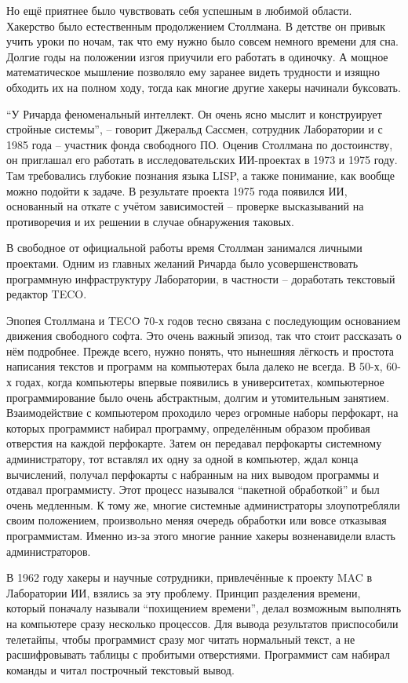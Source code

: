 Но ещё приятнее было чувствовать себя успешным в любимой области. Хакерство было естественным продолжением Столлмана. В детстве он привык учить уроки по ночам, так что ему нужно было совсем немного времени для сна. Долгие годы на положении изгоя приучили его работать в одиночку. А мощное математическое мышление позволяло ему заранее видеть трудности и изящно обходить их на полном ходу, тогда как многие другие хакеры начинали буксовать.

\enquote{У Ричарда феноменальный интеллект. Он очень ясно мыслит и конструирует стройные системы}, -- говорит Джеральд Сассмен, сотрудник Лаборатории и с 1985 года -- участник фонда свободного ПО. Оценив Столлмана по достоинству, он приглашал его работать в исследовательских ИИ-проектах в 1973 и 1975 году. Там требовались глубокие познания языка LISP, а также понимание, как вообще можно подойти к задаче. В результате проекта 1975 года появился ИИ, основанный на откате с учётом зависимостей -- проверке высказываний на противоречия и их решении в случае обнаружения таковых.

В свободное от официальной работы время Столлман занимался личными проектами. Одним из главных желаний Ричарда было усовершенствовать программную инфраструктуру Лаборатории, в частности -- доработать текстовый редактор TECO.

Эпопея Столлмана и TECO 70-х годов тесно связана с последующим основанием движения свободного софта. Это очень важный эпизод, так что стоит рассказать о нём подробнее. Прежде всего, нужно понять, что нынешняя лёгкость и простота написания текстов и программ на компьютерах была далеко не всегда. В 50-х, 60-х годах, когда компьютеры впервые появились в университетах, компьютерное программирование было очень абстрактным, долгим и утомительным занятием. Взаимодействие с компьютером проходило через огромные наборы перфокарт, на которых программист набирал программу, определённым образом пробивая отверстия на каждой перфокарте. Затем он передавал перфокарты системному администратору, тот вставлял их одну за одной в компьютер, ждал конца вычислений, получал перфокарты с набранным на них выводом программы и отдавал программисту. Этот процесс назывался \enquote{пакетной обработкой} и был очень медленным. К тому же, многие системные администраторы злоупотребляли своим положением, произвольно меняя очередь обработки или вовсе отказывая программистам. Именно из-за этого многие ранние хакеры возненавидели власть администраторов.

В 1962 году хакеры и научные сотрудники, привлечённые к проекту MAC в Лаборатории ИИ, взялись за эту проблему. Принцип разделения времени, который поначалу называли \enquote{похищением времени}, делал возможным выполнять на компьютере сразу несколько процессов. Для вывода результатов приспособили телетайпы, чтобы программист сразу мог читать нормальный текст, а не расшифровывать таблицы с пробитыми отверстиями. Программист сам набирал команды и читал построчный текстовый вывод.

